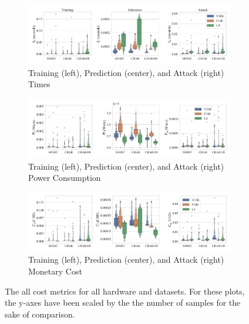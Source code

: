 \documentclass[conference]{IEEEtran}
\begin{document}
\begin{figure}[h]
    \centering
    \begin{subfigure}[b]{.8\textwidth}
        \includegraphics[width=\linewidth,clip]{plots/combined/time.pdf}
        \caption{Training (left), Prediction (center), and Attack (right) Times}
        \label{fig:time}
    \end{subfigure}
    \begin{subfigure}[b]{.8\textwidth}
        \includegraphics[width=\linewidth,clip]{plots/combined/power.pdf}
        \caption{Training (left), Prediction (center), and Attack (right) Power Consumption}
        \label{fig:power}
    \end{subfigure}
    \begin{subfigure}[b]{.8\textwidth}
        \includegraphics[width=\linewidth,clip]{plots/combined/cost.pdf}
        \caption{Training (left), Prediction (center), and Attack (right) Monetary Cost}
        \label{fig:cost}
    \end{subfigure}
    \caption{The all cost metrics for all hardware and datasets. For these plots, the y-axes have been scaled by the the number of samples for the sake of comparison.}
\end{figure}
\end{document}

